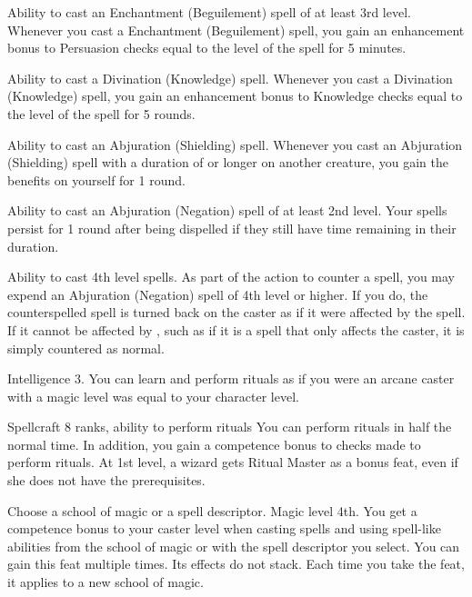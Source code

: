 \featpre Ability to cast an Enchantment (Beguilement) spell of at least 3rd level.
\featben Whenever you cast a Enchantment (Beguilement) spell, you gain an enhancement bonus to Persuasion checks equal to the level of the spell for 5 minutes.

\featpre Ability to cast a Divination (Knowledge) spell.
\featben Whenever you cast a Divination (Knowledge) spell, you gain an enhancement bonus to Knowledge checks equal to the level of the spell for 5 rounds.

\featpre Ability to cast an Abjuration (Shielding) spell.
\featben Whenever you cast an Abjuration (Shielding) spell with a duration of \durshort or longer on another creature, you gain the benefits on yourself for 1 round.

\featpre Ability to cast an Abjuration (Negation) spell of at least 2nd level.
\featben Your spells persist for 1 round after being dispelled if they still have time remaining in their duration.

 Ability to cast 4th level spells.
 As part of the action to counter a spell, you may expend an Abjuration (Negation) spell of 4th level or higher. If you do, the counterspelled spell is turned back on the caster as if it were affected by the  spell. If it cannot be affected by , such as if it is a spell that only affects the caster, it is simply countered as normal.

\featpre Intelligence 3.
\featben You can learn and perform rituals as if you were an arcane caster with a magic level was equal to your character level.

 Spellcraft 8 ranks, ability to perform rituals
 You can perform rituals in half the normal time. In addition, you gain a  competence bonus to checks made to perform rituals.
 At 1st level, a wizard gets Ritual Master as a bonus feat, even if she does not have the prerequisites.

Choose a school of magic or a spell descriptor.
 Magic level 4th.
 You get a  competence bonus to your caster level when casting spells and using spell-like abilities from the school of magic or with the spell descriptor you select.
 You can gain this feat multiple times. Its effects do not stack. Each time you take the feat, it applies to a new school of magic.

